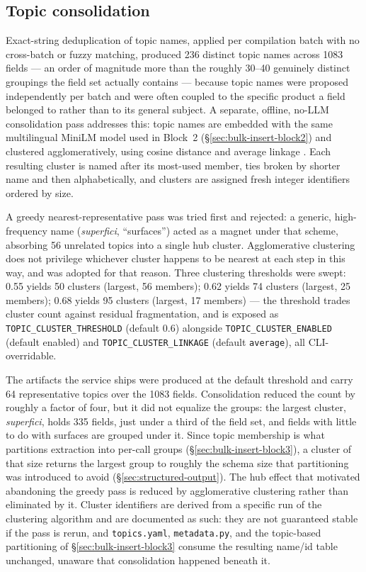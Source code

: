 \subsection{Topic consolidation}
\label{sec:bulk-insert-topic-consolidation}

Exact-string deduplication of topic names, applied per compilation batch with no cross-batch or fuzzy matching, produced 236 distinct topic names across 1083 fields — an order of magnitude more than the roughly 30--40 genuinely distinct groupings the field set actually contains — because topic names were proposed independently per batch and were often coupled to the specific product a field belonged to rather than to its general subject. A separate, offline, no-LLM consolidation pass addresses this: topic names are embedded with the same multilingual MiniLM model used in Block~2 (\S\ref{sec:bulk-insert-block2}) and clustered agglomeratively, using cosine distance and average linkage \citep{ward1963hierarchical,murtagh2012algorithms,pedregosa2011scikit}. Each resulting cluster is named after its most-used member, ties broken by shorter name and then alphabetically, and clusters are assigned fresh integer identifiers ordered by size.



A greedy nearest-representative pass was tried first and rejected: a generic, high-frequency name (\emph{superfici}, ``surfaces'') acted as a magnet under that scheme, absorbing 56 unrelated topics into a single hub cluster. Agglomerative clustering does not privilege whichever cluster happens to be nearest at each step in this way, and was adopted for that reason. Three clustering thresholds were swept: 0.55 yields 50 clusters (largest, 56 members); 0.62 yields 74 clusters (largest, 25 members); 0.68 yields 95 clusters (largest, 17 members) — the threshold trades cluster count against residual fragmentation, and is exposed as \texttt{TOPIC\_CLUSTER\_THRESHOLD} (default 0.6) alongside \texttt{TOPIC\_CLUSTER\_ENABLED} (default enabled) and \texttt{TOPIC\_CLUSTER\_LINKAGE} (default \texttt{average}), all CLI-overridable. 

The artifacts the service ships were produced at the default threshold and carry 64 representative topics over the 1083 fields. Consolidation reduced the count by roughly a factor of four, but it did not equalize the groups: the largest cluster, \emph{superfici}, holds 335 fields, just under a third of the field set, and fields with little to do with surfaces are grouped under it. Since topic membership is what partitions extraction into per-call groups (\S\ref{sec:bulk-insert-block3}), a cluster of that size returns the largest group to roughly the schema size that partitioning was introduced to avoid (\S\ref{sec:structured-output}). The hub effect that motivated abandoning the greedy pass is reduced by agglomerative clustering rather than eliminated by it. Cluster identifiers are derived from a specific run of the clustering algorithm and are documented as such: they are not guaranteed stable if the pass is rerun, and \texttt{topics.yaml}, \texttt{metadata.py}, and the topic-based partitioning of \S\ref{sec:bulk-insert-block3} consume the resulting name/id table unchanged, unaware that consolidation happened beneath it.

